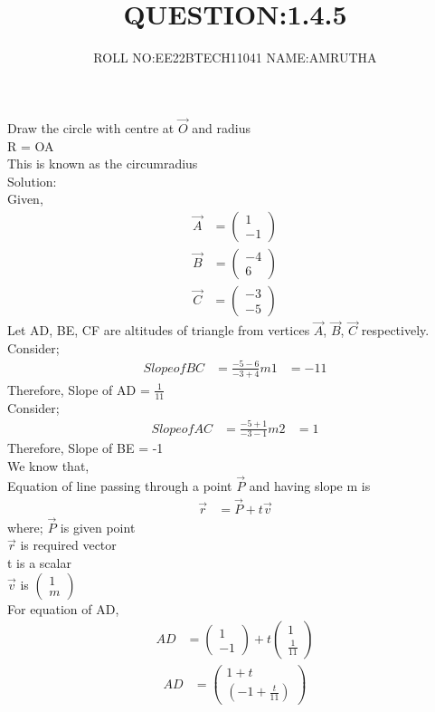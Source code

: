\documentclass[journal,12pt,onecolumn]{IEEEtran}
\newcommand{\myvec}[1]{\ensuremath{\begin{pmatrix}#1\end{pmatrix}}}
\begin{document}

\vspace{3cm}
\title{
\textbf{QUESTION:1.4.5
	}
}
\author{ ROLL NO:EE22BTECH11041
         NAME:AMRUTHA
}	
Draw the circle with centre at $\vec{O}$ and radius\\
R = OA\\
This is known as the circumradius\\
Solution:\\
Given,\\
\begin{align}
\vec{A} &= \myvec{1\\-1}
\end{align}
\begin{align}
\vec{B} &= \myvec{-4\\6}
\end{align}
\begin{align}
\vec{C} &= \myvec{-3\\-5}
\end{align}
Let AD, BE, CF are altitudes of triangle from vertices $\vec{A}$, $\vec{B}$, $\vec{C}$ respectively.\\
Consider;
\begin{align}
Slope of BC &= \frac{-5-6}{-3+4}
                m1 &= -11
\end{align}
Therefore, Slope of AD = $\frac{1}{11}$\\
Consider;
\begin{align}
Slope of AC &= \frac{-5+1}{-3-1}
                m2 &= 1
\end{align}
Therefore, Slope of BE = -1\\
We know that,\\
Equation of line passing through a point $\vec{P}$ and having slope m is
\begin{align}
       \vec{r} &= \vec{P} + t\vec{v}
\end{align}
where; $\vec{P}$ is given point\\
       $\vec{r}$ is required vector\\
       t is a scalar\\
       $\vec{v}$ is \myvec{1\\m}\\
For equation of AD,
\begin{align}
       AD &= \myvec{1\\-1} + t\myvec{1\\\frac{1}{11}}
\end{align}
\begin{align}
       AD &= \myvec{1+t\\\left(-1+\frac{t}{11}\right)}
\end{align}
\end{document}
